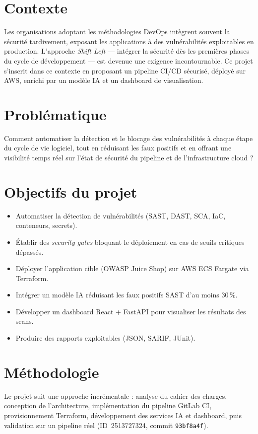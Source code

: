 \documentclass[12pt,a4paper]{report}
\begin{document}
\section{Contexte}
Les organisations adoptant les méthodologies DevOps intègrent souvent la sécurité tardivement, exposant les applications à des vulnérabilités exploitables en production. L'approche \textit{Shift Left} --- intégrer la sécurité dès les premières phases du cycle de développement --- est devenue une exigence incontournable. Ce projet s'inscrit dans ce contexte en proposant un pipeline CI/CD sécurisé, déployé sur AWS, enrichi par un modèle IA et un dashboard de visualisation.

\section{Problématique}
Comment automatiser la détection et le blocage des vulnérabilités à chaque étape du cycle de vie logiciel, tout en réduisant les faux positifs et en offrant une visibilité temps réel sur l'état de sécurité du pipeline et de l'infrastructure cloud ?

\section{Objectifs du projet}
\begin{itemize}
    \item Automatiser la détection de vulnérabilités (SAST, DAST, SCA, IaC, conteneurs, secrets).
    \item Établir des \textit{security gates} bloquant le déploiement en cas de seuils critiques dépassés.
    \item Déployer l'application cible (OWASP Juice Shop) sur AWS ECS Fargate via Terraform.
    \item Intégrer un modèle IA réduisant les faux positifs SAST d'au moins 30\,\%.
    \item Développer un dashboard React + FastAPI pour visualiser les résultats des scans.
    \item Produire des rapports exploitables (JSON, SARIF, JUnit).
\end{itemize}

\section{Méthodologie}
Le projet suit une approche incrémentale : analyse du cahier des charges, conception de l'architecture, implémentation du pipeline GitLab CI, provisionnement Terraform, développement des services IA et dashboard, puis validation sur un pipeline réel (ID~2513727324, commit \texttt{93bf8a4f}).
\end{document}
